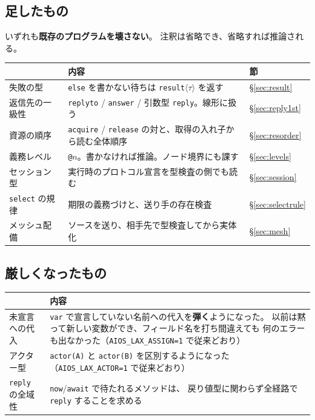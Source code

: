 \documentclass[11pt,a4paper]{ltjsarticle}
\begin{document}
\subsection{足したもの}

いずれも\textbf{既存のプログラムを壊さない}。
注釈は省略でき、省略すれば推論される。

\begin{center}
\small
\begin{tabular}{@{}lp{7.4cm}l@{}}
\toprule
 & 内容 & 節 \\
\midrule
失敗の型 & \texttt{else} を書かない待ちは \texttt{result}$\langle\tau\rangle$ を返す
  & \S\ref{sec:result} \\
返信先の一級性 & \texttt{replyto} / \texttt{answer} / 引数型 \texttt{reply}。線形に扱う
  & \S\ref{sec:reply1st} \\
資源の順序 & \texttt{acquire} / \texttt{release} の対と、取得の入れ子から読む全体順序
  & \S\ref{sec:resorder} \\
義務レベル & \texttt{@$n$}。書かなければ推論。ノード境界にも課す
  & \S\ref{sec:levels} \\
セッション型 & 実行時のプロトコル宣言を型検査の側でも読む
  & \S\ref{sec:session} \\
\texttt{select} の規律 & 期限の義務づけと、送り手の存在検査
  & \S\ref{sec:selectrule} \\
メッシュ配備 & ソースを送り、相手先で型検査してから実体化
  & \S\ref{sec:mesh} \\
\bottomrule
\end{tabular}
\end{center}

\subsection{厳しくなったもの}

\begin{center}
\small
\begin{tabular}{@{}lp{8.6cm}@{}}
\toprule
 & 内容 \\
\midrule
未宣言への代入 & \texttt{var} で宣言していない名前への代入を\textbf{弾く}ようになった。
  以前は黙って新しい変数ができ、フィールド名を打ち間違えても
  何のエラーも出なかった（\texttt{AIOS\_LAX\_ASSIGN=1} で従来どおり） \\
アクター型 & \texttt{actor(A)} と \texttt{actor(B)} を区別するようになった
  （\texttt{AIOS\_LAX\_ACTOR=1} で従来どおり） \\
\texttt{reply} の全域性 & \texttt{now}/\texttt{await} で待たれるメソッドは、
  戻り値型に関わらず全経路で \texttt{reply} することを求める \\
\bottomrule
\end{tabular}
\end{center}
\end{document}
